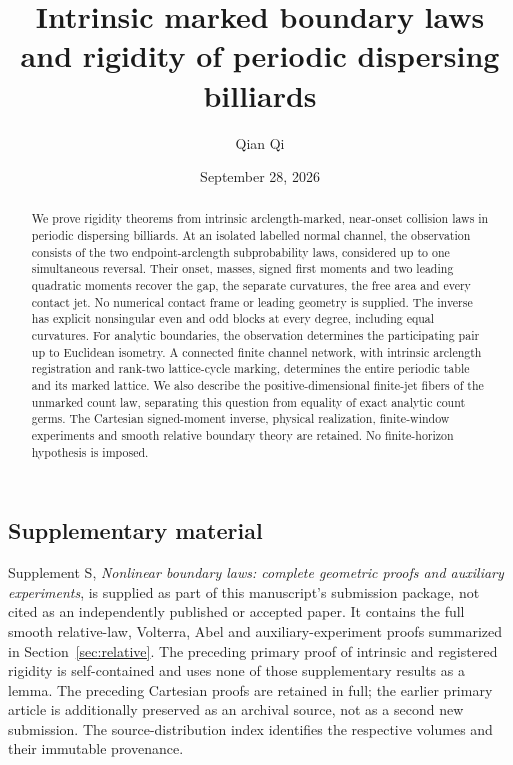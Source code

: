 \documentclass[11pt]{amsart}
\title[Intrinsic marked boundary laws]{Intrinsic marked boundary laws and rigidity of periodic dispersing billiards}
\author{Qian Qi}
\date{September 28, 2026}
\theoremstyle{definition}\newtheorem{definition}[theorem]{Definition}
\theoremstyle{remark}\newtheorem{remark}[theorem]{Remark}
\numberwithin{equation}{section}
\begin{document}
\begin{abstract}
We prove rigidity theorems from intrinsic arclength-marked, near-onset
collision laws in periodic dispersing billiards. At an isolated labelled
normal channel, the observation consists of the two endpoint-arclength
subprobability laws, considered up to one simultaneous reversal. Their
onset, masses, signed first moments and two leading quadratic moments
recover the gap, the separate curvatures, the free area and every contact
jet. No numerical contact frame or leading geometry is supplied. The
inverse has explicit nonsingular even and odd blocks at every degree,
including equal curvatures. For analytic boundaries, the observation
determines the participating pair up to Euclidean isometry. A connected
finite channel network, with intrinsic arclength registration and
rank-two lattice-cycle marking, determines the entire periodic table
and its marked lattice. We also describe the positive-dimensional
finite-jet fibers of the unmarked count law, separating this question
from equality of exact analytic count germs. The Cartesian signed-moment
inverse, physical realization, finite-window experiments and smooth
relative boundary theory are retained. No finite-horizon hypothesis is
imposed.
\end{abstract}
\maketitle










\subsection*{Supplementary material}
Supplement S, \emph{Nonlinear boundary laws: complete geometric proofs
and auxiliary experiments}, is supplied as part of this manuscript's
submission package, not cited as an independently published or accepted
paper. It contains the full smooth relative-law, Volterra, Abel and
auxiliary-experiment proofs summarized in Section~\ref{sec:relative}.
The preceding primary proof of intrinsic and registered rigidity is
self-contained and uses none of those supplementary results as a lemma.
The preceding Cartesian proofs are retained in full; the earlier primary
article is additionally preserved as an archival source, not as a second
new submission. The source-distribution index identifies the respective
volumes and their immutable provenance.
\end{document}
